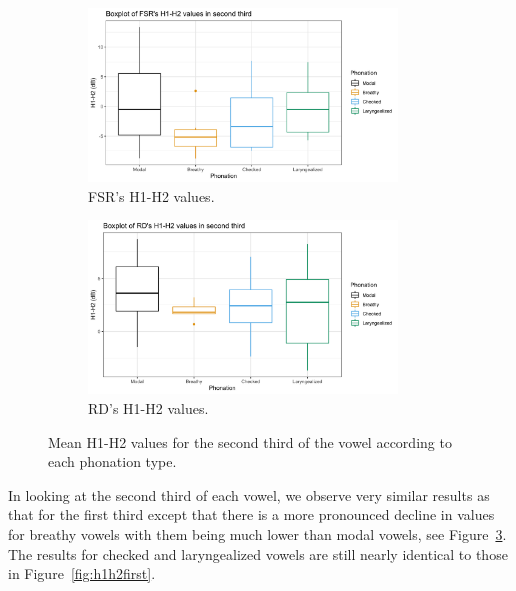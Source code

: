 \documentclass[12pt, letterpaper]{article}
\begin{document}
\begin{figure}[!ht]
	\centering
	\begin{subfigure}{.5\textwidth}
		\centering
		\includegraphics[width=0.9\textwidth]{../mean_FSR_h1h2_2nd.png}
		\caption{FSR's H1-H2 values.}
		\label{fig:FSRh1h2second} 
	\end{subfigure}%
	\begin{subfigure}{.5\textwidth}
		\centering
		\includegraphics[width=0.9\textwidth]{../mean_RD_h1h2_2nd.png}
		\caption{RD's H1-H2 values.}
		\label{fig:RDh1h2second} 
	\end{subfigure}
	\caption{Mean H1-H2 values for the second third of the vowel according to each phonation type.}
	\label{fig:h1h2second}
\end{figure}

In looking at the second third of each vowel, we observe very similar results as that for the first third except that there is a more pronounced decline in values for breathy vowels with them being much lower than modal vowels, see Figure~\ref{fig:h1h2second}. The results for checked and laryngealized vowels are still nearly identical to those in Figure~\ref{fig:h1h2first}.
\end{document}
